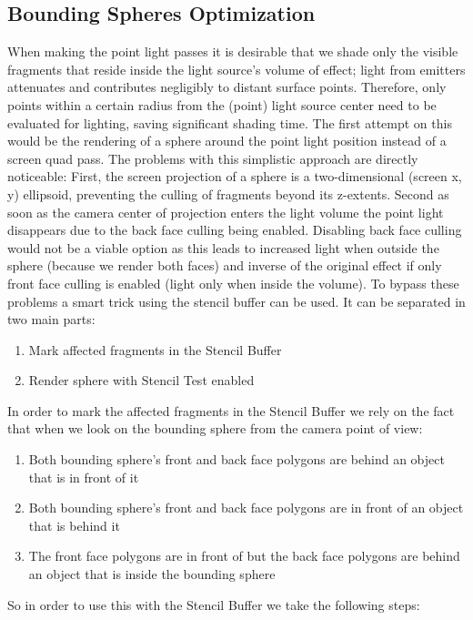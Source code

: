 \subsection{Bounding Spheres Optimization}

When making the point light passes it is desirable that we shade only the visible fragments that reside inside the light
source's volume of effect; light from emitters attenuates and contributes negligibly to distant
surface points. Therefore, only points within a certain radius from the (point) light source
center need to be evaluated for lighting, saving significant shading time.
The first attempt on this would be the rendering of a sphere around the point light position instead
of a screen quad pass. The problems with this simplistic approach are directly noticeable:
First, the screen projection of a sphere is a two-dimensional (screen x, y) ellipsoid, preventing
the culling of fragments beyond its z-extents.
Second as soon as the camera center of projection enters the light volume the point light disappears
due to the back face culling being enabled. Disabling back face culling would not be a viable option
as this leads to increased light when outside the sphere (because we render both faces) and inverse
of the original effect if only front face culling is enabled (light only when inside the volume).
To bypass these problems a smart trick using the stencil buffer can be used. It can be separated in two main parts:
\begin{enumerate}
    \item Mark affected fragments in the Stencil Buffer
    \item Render sphere with Stencil Test enabled
\end{enumerate}
In order to mark the affected fragments in the Stencil Buffer we rely on the fact that when we look on the bounding
sphere from the camera point of view:
\begin{enumerate}
    \item Both bounding sphere's front and back face polygons are behind an object that is in front of it
    \item Both bounding sphere's front and back face polygons are in front of an object that is behind it
    \item The front face polygons are in front of but the back face polygons are behind an object that is inside the bounding sphere
\end{enumerate}
So in order to use this with the Stencil Buffer we take the following steps:
